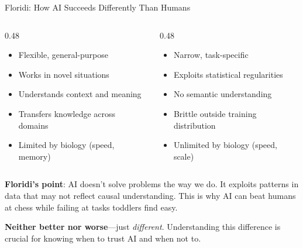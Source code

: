 ﻿\documentclass[aspectratio=169,11pt]{beamer}
\begin{document}
\begin{frame}{Floridi: How AI Succeeds Differently Than Humans}
\begin{columns}[T]
\begin{column}{0.48\textwidth}
\begin{probox}
\scriptsize
\begin{itemize}
    \item Flexible, general-purpose
    \item Works in novel situations
    \item Understands context and meaning
    \item Transfers knowledge across domains
    \item Limited by biology (speed, memory)
\end{itemize}
\end{probox}
\end{column}
\begin{column}{0.48\textwidth}
\begin{conceptbox}[AI Agency]
\scriptsize
\begin{itemize}
    \item Narrow, task-specific
    \item Exploits statistical regularities
    \item No semantic understanding
    \item Brittle outside training distribution
    \item Unlimited by biology (speed, scale)
\end{itemize}
\end{conceptbox}
\end{column}
\end{columns}

\vspace{0.3em}
\textbf{Floridi's point}: AI doesn't solve problems the way we do. It exploits patterns in data that may not reflect causal understanding. This is why AI can beat humans at chess while failing at tasks toddlers find easy.

\vspace{0.2em}
\textbf{Neither better nor worse}---just \emph{different}. Understanding this difference is crucial for knowing when to trust AI and when not to.
\end{frame}
\end{document}
